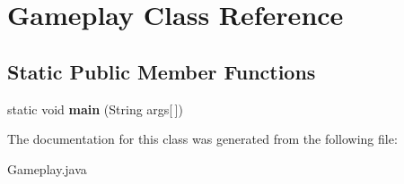 \hypertarget{class_gameplay}{}\section{Gameplay Class Reference}
\label{class_gameplay}
\subsection*{Static Public Member Functions}
\begin{DoxyCompactItemize}
\item 
\hypertarget{class_gameplay_ab6378a6e29dfbc0f2a977edaa9e05664}{}static void {\bfseries main} (String args\mbox{[}$\,$\mbox{]})\label{class_gameplay_ab6378a6e29dfbc0f2a977edaa9e05664}

\end{DoxyCompactItemize}


The documentation for this class was generated from the following file\+:\begin{DoxyCompactItemize}
\item 
Gameplay.\+java\end{DoxyCompactItemize}
